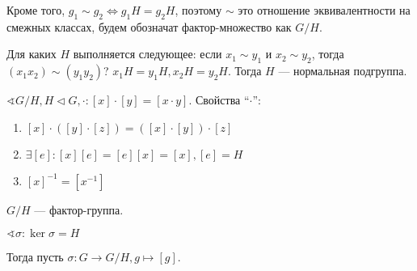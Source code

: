 Кроме того, \(g_1 \sim g_2 \Leftrightarrow g_1H = g_2H\), поэтому \(\sim\) это отношение эквивалентности на смежных классах, будем обозначат фактор-множество как \(G / H\).

Для каких \(H\) выполняется следующее: если \(x_1 \sim y_1\) и \(x_2 \sim y_2\), тогда \((x_1 x_2) \sim (y_1 y_2)\)? \(x_1 H = y_1 H, x_2 H = y_2 H\). Тогда \(H\) --- нормальная подгруппа.

\(\sphericalangle G / H, H \vartriangleleft G, \cdot : [x] \cdot [y] = [x \cdot y]\).
Свойства ``\( \cdot \)'':
\begin{enumerate}
    \item \([x] \cdot ([y] \cdot [z]) = ([x] \cdot [y]) \cdot [z]\)
    \item \(\exists [e] : [x][e] = [e][x] = [x], [e] = H\)
    \item \([x]^{-1} = [x^{-1}]\)
\end{enumerate}
\begin{remark}
    \(G / H\) --- фактор-группа.
\end{remark}

\(\sphericalangle \sigma : \ker \sigma = H\)

Тогда пусть \(\sigma : G \to G / H, g \mapsto [g]\).
